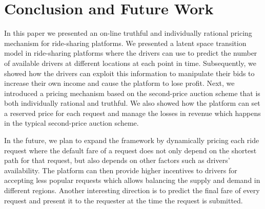 \vspace{-0.05in}
\section{Conclusion and Future Work}
\label{sec:conclusion}

In this paper we presented an on-line truthful and individually rational pricing mechanism for ride-sharing platforms. We presented a latent space transition model in ride-sharing platforms where the drivers can use to predict the number of available drivers at different locations at each point in time. Subsequently, we showed how the drivers can exploit this information to manipulate their bids to increase their own income and cause the platform to lose profit. Next, we introduced a pricing mechanism based on the second-price auction scheme that is both individually rational and truthful. We also showed how the platform can set a reserved price for each request and manage the losses in revenue which happens in the typical second-price auction scheme.

In the future, we plan to expand the framework by dynamically pricing each ride request where the default fare of a request does not only depend on the shortest path for that request, but also depends on other factors such as drivers' availability. The platform can then provide higher incentives to drivers for accepting less popular requests which allows balancing the supply and demand in different regions. Another interesting direction is to predict the final fare of every request and present it to the requester at the time the request is submitted.